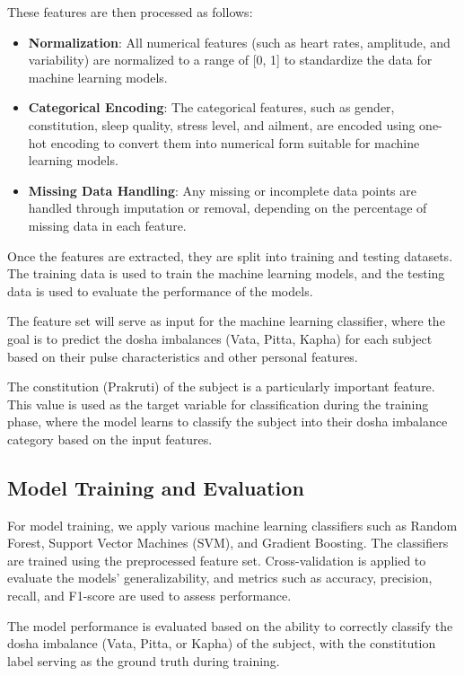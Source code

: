 \documentclass[10pt,twocolumn]{article}
\begin{document}
These features are then processed as follows:

\begin{itemize}
    \item \textbf{Normalization}: All numerical features (such as heart rates, amplitude, and variability) are normalized to a range of [0, 1] to standardize the data for machine learning models.
    \item \textbf{Categorical Encoding}: The categorical features, such as gender, constitution, sleep quality, stress level, and ailment, are encoded using one-hot encoding to convert them into numerical form suitable for machine learning models.
    \item \textbf{Missing Data Handling}: Any missing or incomplete data points are handled through imputation or removal, depending on the percentage of missing data in each feature.
\end{itemize}

Once the features are extracted, they are split into training and testing datasets. The training data is used to train the machine learning models, and the testing data is used to evaluate the performance of the models.

The feature set will serve as input for the machine learning classifier, where the goal is to predict the dosha imbalances (Vata, Pitta, Kapha) for each subject based on their pulse characteristics and other personal features.

The constitution (Prakruti) of the subject is a particularly important feature. This value is used as the target variable for classification during the training phase, where the model learns to classify the subject into their dosha imbalance category based on the input features.

\subsection{Model Training and Evaluation}

For model training, we apply various machine learning classifiers such as Random Forest, Support Vector Machines (SVM), and Gradient Boosting. The classifiers are trained using the preprocessed feature set. Cross-validation is applied to evaluate the models' generalizability, and metrics such as accuracy, precision, recall, and F1-score are used to assess performance.

The model performance is evaluated based on the ability to correctly classify the dosha imbalance (Vata, Pitta, or Kapha) of the subject, with the constitution label serving as the ground truth during training.
\end{document}
